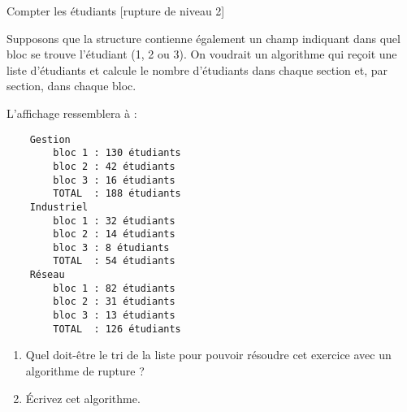 \begin{Exercice}{Compter les étudiants [rupture de niveau 2]}
	
	Supposons que la structure  contienne également
	un champ indiquant dans quel bloc se trouve l'étudiant (1, 2 ou 3).
	On voudrait un algorithme qui reçoit une liste d'étudiants et calcule
	le nombre d'étudiants dans chaque section et, par section, dans chaque bloc.
	
	L'affichage ressemblera à :
	{\small
	\begin{verbatim}
    Gestion
        bloc 1 : 130 étudiants
        bloc 2 : 42 étudiants
        bloc 3 : 16 étudiants
        TOTAL  : 188 étudiants
    Industriel
        bloc 1 : 32 étudiants
        bloc 2 : 14 étudiants
        bloc 3 : 8 étudiants
        TOTAL  : 54 étudiants
    Réseau
        bloc 1 : 82 étudiants
        bloc 2 : 31 étudiants
        bloc 3 : 13 étudiants
        TOTAL  : 126 étudiants
	\end{verbatim}
	}
	\begin{enumerate}[label=\alph*)]
		\item 
		Quel doit-être le tri de la liste pour pouvoir résoudre cet exercice
		avec un algorithme de rupture ?
		\item 
		Écrivez cet algorithme.
	\end{enumerate}
\end{Exercice}
	
